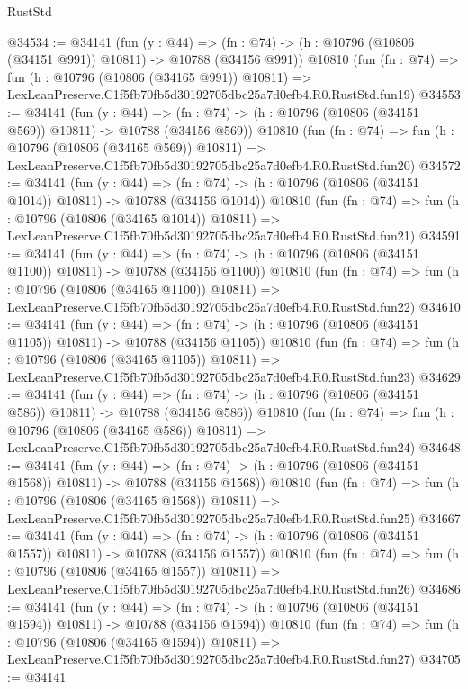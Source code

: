 \begin{lexlean}{RustStd}
\begin{coremodule}
@34534 := @34141
    (fun (y : @44) =>
    (fn : @74) -> (h : @10796 (@10806 (@34151 @991)) @10811) -> @10788 (@34156 @991))
    @10810
    (fun (fn : @74) =>
    fun (h : @10796 (@10806 (@34165 @991)) @10811) =>
    LexLeanPreserve.C1f5fb70fb5d30192705dbc25a7d0efb4.R0.RustStd.fun19)
@34553 := @34141
    (fun (y : @44) =>
    (fn : @74) -> (h : @10796 (@10806 (@34151 @569)) @10811) -> @10788 (@34156 @569))
    @10810
    (fun (fn : @74) =>
    fun (h : @10796 (@10806 (@34165 @569)) @10811) =>
    LexLeanPreserve.C1f5fb70fb5d30192705dbc25a7d0efb4.R0.RustStd.fun20)
@34572 := @34141
    (fun (y : @44) =>
    (fn : @74) -> (h : @10796 (@10806 (@34151 @1014)) @10811) -> @10788 (@34156 @1014))
    @10810
    (fun (fn : @74) =>
    fun (h : @10796 (@10806 (@34165 @1014)) @10811) =>
    LexLeanPreserve.C1f5fb70fb5d30192705dbc25a7d0efb4.R0.RustStd.fun21)
@34591 := @34141
    (fun (y : @44) =>
    (fn : @74) -> (h : @10796 (@10806 (@34151 @1100)) @10811) -> @10788 (@34156 @1100))
    @10810
    (fun (fn : @74) =>
    fun (h : @10796 (@10806 (@34165 @1100)) @10811) =>
    LexLeanPreserve.C1f5fb70fb5d30192705dbc25a7d0efb4.R0.RustStd.fun22)
@34610 := @34141
    (fun (y : @44) =>
    (fn : @74) -> (h : @10796 (@10806 (@34151 @1105)) @10811) -> @10788 (@34156 @1105))
    @10810
    (fun (fn : @74) =>
    fun (h : @10796 (@10806 (@34165 @1105)) @10811) =>
    LexLeanPreserve.C1f5fb70fb5d30192705dbc25a7d0efb4.R0.RustStd.fun23)
@34629 := @34141
    (fun (y : @44) =>
    (fn : @74) -> (h : @10796 (@10806 (@34151 @586)) @10811) -> @10788 (@34156 @586))
    @10810
    (fun (fn : @74) =>
    fun (h : @10796 (@10806 (@34165 @586)) @10811) =>
    LexLeanPreserve.C1f5fb70fb5d30192705dbc25a7d0efb4.R0.RustStd.fun24)
@34648 := @34141
    (fun (y : @44) =>
    (fn : @74) -> (h : @10796 (@10806 (@34151 @1568)) @10811) -> @10788 (@34156 @1568))
    @10810
    (fun (fn : @74) =>
    fun (h : @10796 (@10806 (@34165 @1568)) @10811) =>
    LexLeanPreserve.C1f5fb70fb5d30192705dbc25a7d0efb4.R0.RustStd.fun25)
@34667 := @34141
    (fun (y : @44) =>
    (fn : @74) -> (h : @10796 (@10806 (@34151 @1557)) @10811) -> @10788 (@34156 @1557))
    @10810
    (fun (fn : @74) =>
    fun (h : @10796 (@10806 (@34165 @1557)) @10811) =>
    LexLeanPreserve.C1f5fb70fb5d30192705dbc25a7d0efb4.R0.RustStd.fun26)
@34686 := @34141
    (fun (y : @44) =>
    (fn : @74) -> (h : @10796 (@10806 (@34151 @1594)) @10811) -> @10788 (@34156 @1594))
    @10810
    (fun (fn : @74) =>
    fun (h : @10796 (@10806 (@34165 @1594)) @10811) =>
    LexLeanPreserve.C1f5fb70fb5d30192705dbc25a7d0efb4.R0.RustStd.fun27)
@34705 := @34141

\end{coremodule}
\end{lexlean}
